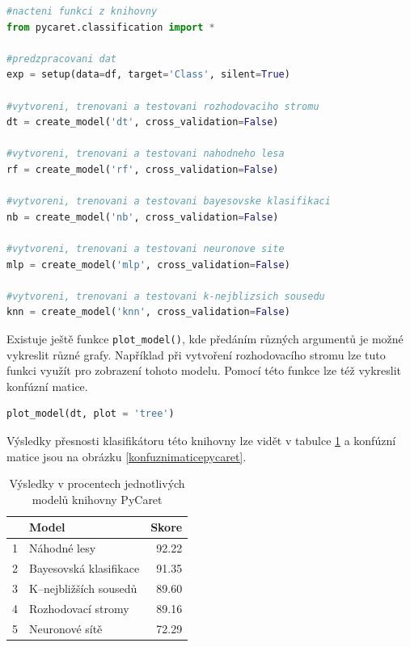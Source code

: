 \begin{mdframed}
\begin{lstlisting}[language=Python]
#nacteni funkci z knihovny
from pycaret.classification import *

#predzpracovani dat
exp = setup(data=df, target='Class', silent=True)

#vytvoreni, trenovani a testovani rozhodovaciho stromu
dt = create_model('dt', cross_validation=False)

#vytvoreni, trenovani a testovani nahodneho lesa
rf = create_model('rf', cross_validation=False)

#vytvoreni, trenovani a testovani bayesovske klasifikaci
nb = create_model('nb', cross_validation=False)

#vytvoreni, trenovani a testovani neuronove site
mlp = create_model('mlp', cross_validation=False)

#vytvoreni, trenovani a testovani k-nejblizsich sousedu
knn = create_model('knn', cross_validation=False)
\end{lstlisting}   
\end{mdframed}
Existuje ještě funkce \verb|plot_model()|, kde předáním různých argumentů je možné vykreslit různé grafy. Například při vytvoření rozhodovacího stromu lze tuto funkci využít pro zobrazení tohoto modelu. Pomocí této funkce lze též vykreslit konfúzní matice.

\begin{mdframed}
\begin{lstlisting}[language=Python]
plot_model(dt, plot = 'tree')
\end{lstlisting}   
\end{mdframed}

Výsledky přesnosti klasifikátoru této knihovny lze vidět v tabulce \ref{tab6} a konfúzní matice jsou na obrázku \ref{konfuznimaticepycaret}.

\begin{table}[]
    \centering
    \begin{tabular}{llr}
\toprule
{} &                    Model &      Skore \\
\midrule
1 &             Náhodné lesy &  92.22 \\
2 &  Bayesovská klasifikace &  91.35 \\
3 &       K–nejbližších sousedů & 89.60 \\
4 &    Rozhodovací stromy &  89.16 \\
5 &           Neuronové sítě &  72.29 \\
\bottomrule
\end{tabular}
    \caption{Výsledky v procentech jednotlivých modelů knihovny PyCaret}
    \label{tab6}
\end{table}

